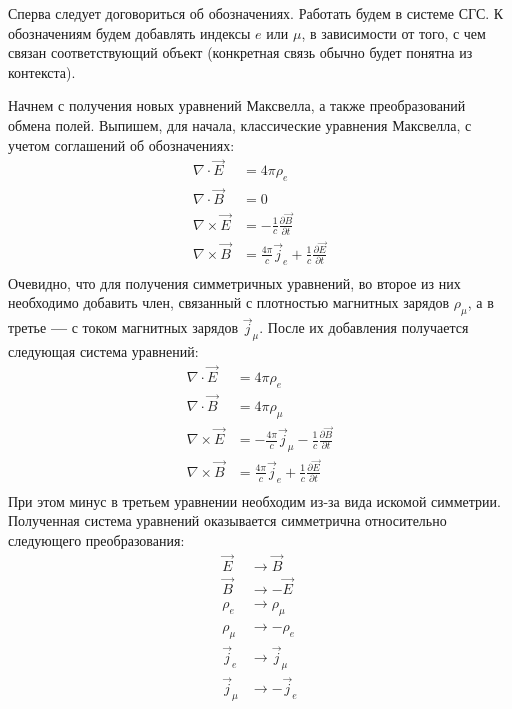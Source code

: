 \documentclass[oneside,final,14pt]{extarticle}
\begin{document}
	Сперва следует договориться об обозначениях. Работать будем в системе СГС. К обозначениям будем добавлять индексы $e$ или $\mu$, в зависимости от того, с чем связан соответствующий объект (конкретная связь обычно будет понятна из контекста). 
	
	Начнем с получения новых уравнений Максвелла, а также преобразований обмена полей. Выпишем, для начала, классические уравнения Максвелла, с учетом соглашений об обозначениях: 
	$$
	\begin{aligned} 
		\nabla \cdot \vec E & = 4\pi\rho_{e} \\
		\nabla \cdot \vec B & = 0 \\
		\nabla \times \vec E & = -\frac{1}{c}\frac{\partial \vec B}{\partial t} \\
		\nabla \times \vec B & = \frac{4\pi}{c}\vec j_{e}+\frac{1}{c}\frac{\partial \vec E}{\partial t} \\
	\end{aligned}
	$$
	Очевидно, что для получения симметричных уравнений, во второе из них необходимо добавить член, связанный с плотностью магнитных зарядов $\rho_{\mu}$, а в третье \textbf{---} с током магнитных зарядов $\vec j_{\mu}$. После их добавления получается следующая система уравнений:
	$$
	\begin{aligned} 
		\nabla \cdot \vec E & = 4\pi\rho_{e} \\
		\nabla \cdot \vec B & =4\pi\rho_{\mu} \\
		\nabla \times \vec E & = -\frac{4\pi}{c}\vec j_{\mu}-\frac{1}{c}\frac{\partial \vec B}{\partial t} \\
		\nabla \times \vec B & = \frac{4\pi}{c}\vec j_{e}+\frac{1}{c}\frac{\partial \vec E}{\partial t} \\
	\end{aligned}
	$$
	При этом минус в третьем уравнении необходим из-за вида искомой симметрии. Полученная система уравнений оказывается симметрична относительно следующего преобразования:
	$$
	\begin{aligned} 
		\vec E & \rightarrow \vec B \\
		\vec B & \rightarrow -\vec E \\
		\rho_{e} & \rightarrow \rho_{\mu} \\
		\rho_{\mu} & \rightarrow -\rho_{e} \\
		\vec j_{e} & \rightarrow \vec j_{\mu} \\
		\vec j_{\mu} & \rightarrow -\vec j_{e} \\
	\end{aligned}
	$$
\end{document}

